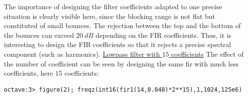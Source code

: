 \documentclass[12pt,oneside]{article}
\begin{document}
The importance of designing the filter coefficients adapted to one precise situation is clearly visible here, since the blocking range is not flat but constituted of small bounces. The rejection between the top and the bottom of the bounces can exceed $20~dB$ depending on the FIR coefficients. Thus, it is interesting to design the FIR coefficients so that it rejects a precise spectral component (such as harmonics).
\newline\newline
\underline{Lowpass filter with $15$ coefficients}\newline\newline
The effect of the number of coefficient can be seen by designing the same fir with much less coefficients, here $15$ coefficients:

\vspace{-0.1cm}
\begin{lstlisting}
octave:3> figure(2); freqz(int16(fir1(14,0.048)*2**15),1,1024,125e6)
\end{lstlisting}
\vspace{-0cm}
\end{document}

